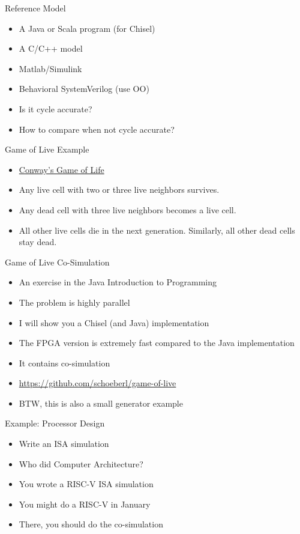 \begin{frame}[fragile]{Reference Model}
\begin{itemize}
\item A Java or Scala program (for Chisel)
\item A C/C++ model
\item Matlab/Simulink
\item Behavioral SystemVerilog (use OO)
\item Is it cycle accurate?
\item How to compare when not cycle accurate?
\end{itemize}
\end{frame}

\begin{frame}[fragile]{Game of Live Example}
\begin{itemize}
\item \href{https://en.wikipedia.org/wiki/Conway\%27s_Game_of_Life}{Conway's Game of Life}
\item Any live cell with two or three live neighbors survives.
\item Any dead cell with three live neighbors becomes a live cell.
\item All other live cells die in the next generation. Similarly, all other dead cells stay dead.
\end{itemize}
\end{frame}

\begin{frame}[fragile]{Game of Live Co-Simulation}
\begin{itemize}
\item An exercise in the Java Introduction to Programming
\item The problem is highly parallel
\item I will show you a Chisel (and Java) implementation
\item The FPGA version is extremely fast compared to the Java implementation
\item It contains co-simulation
\item \url{https://github.com/schoeberl/game-of-live}
\item BTW, this is also a small generator example
\end{itemize}
\end{frame}

\begin{frame}[fragile]{Example: Processor Design}
\begin{itemize}
\item Write an ISA simulation
\item Who did Computer Architecture?
\item You wrote a RISC-V ISA simulation
\item You might do a RISC-V in January
\item There, you should do the co-simulation
\end{itemize}
\end{frame}

